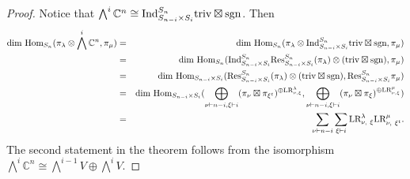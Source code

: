 \documentclass[11pt]{amsart}
\numberwithin{equation}{section}
\theoremstyle{definition}
\begin{document}
\begin{proof}
    Notice that $\bigwedge^{i}\mathbb{C}^{n}\cong\textnormal{Ind}^{S_{n}}_{S_{n-i}\times S_{i}} \textnormal{triv}\boxtimes\textnormal{sgn}$. Then 
    \begin{eqnarray*}
        \textnormal{dim}\ \textnormal{Hom}_{S_{n}}(\pi_{\lambda}\otimes\bigwedge^{i}\mathbb{C}^{n}, \pi_{\mu})&=&\textnormal{dim}\ \textnormal{Hom}_{S_{n}}(\pi_{\lambda}\otimes \textnormal{Ind}^{S_{n}}_{S_{n-i}\times S_{i}} \textnormal{triv}\boxtimes\textnormal{sgn}, \pi_{\mu})\\
        &=& \textnormal{dim}\ \textnormal{Hom}_{S_{n}}(\textnormal{Ind}^{S_{n}}_{S_{n-i}\times S_{i}} \textnormal{Res}^{S_{n}}_{S_{n-i}\times S_{i}}(\pi_{\lambda})\otimes(\textnormal{triv}\boxtimes\textnormal{sgn}), \pi_{\mu})\\
        &=&\textnormal{dim}\ \textnormal{Hom}_{S_{n-i}\times S_{i}}(\textnormal{Res}^{S_{n}}_{S_{n-i}\times S_{i}}(\pi_{\lambda})\otimes(\textnormal{triv}\boxtimes\textnormal{sgn}), \textnormal{Res}^{S_{n}}_{S_{n-i}\times S_{i}}\pi_{\mu})\\
        &=& 
        \textnormal{dim}\ \textnormal{Hom}_{S_{n-i}\times S_{i}}(\bigoplus_{\nu \vdash n-i, \xi \vdash i} (\pi_{\nu} \boxtimes \pi_{{\xi}^{t}})^{\oplus \textnormal{LR}_{\nu, \xi}^\lambda}, \bigoplus_{\nu \vdash n-i, \xi \vdash i} (\pi_{\nu} \boxtimes \pi_{\xi})^{\oplus \textnormal{LR}_{\nu, \xi}^\mu})\\
        &=&\sum\limits_{\nu\vdash n-i}\sum\limits_{\xi\vdash i} \textnormal{LR}^{\lambda}_{\nu,\ \xi}\textnormal{LR}^{\mu}_{\nu,\ \xi^{t}}.
    \end{eqnarray*}
The second statement in the theorem follows from the isomorphism $\bigwedge^{i}\mathbb{C}^{n}\cong\bigwedge^{i-1}V\oplus\bigwedge^{i}V$.
\end{proof}
\end{document}
